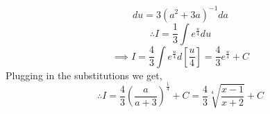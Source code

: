 \documentclass[14pt]{article}
\begin{document}
	\begin{equation*}
		du = 3(a^2+3a)^{-1}da
	\end{equation*}
	\begin{equation*}
		\therefore I = \frac{1}{3}\int e^{\frac{u}{4}} du
	\end{equation*}
	\begin{equation*}
		\implies I = \frac{4}{3} \int e^{\frac{u}{4}} d[\frac{u}{4}] = \frac{4}{3} e^{\frac{u}{4}} + C
	\end{equation*}
	Plugging in the substitutions we get,
	\begin{equation*}
		\therefore I = \frac{4}{3} (\frac{a}{a+3})^{\frac{1}{4}} +C=\boxed{\frac{4}{3} \sqrt[4]{\frac{x-1}{x+2}} +C}
	\end{equation*}
\end{document}
